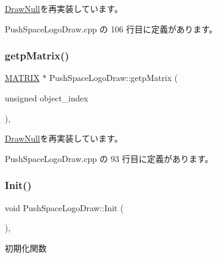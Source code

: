 \mbox{\hyperlink{class_draw_null_aa07d7e89e723b68ec257da0f63d43f70}{Draw\+Null}}を再実装しています。



 Push\+Space\+Logo\+Draw.\+cpp の 106 行目に定義があります。

\mbox{\label{class_push_space_logo_draw_a9e0875967651293ef97713477334bc2e}} 
\subsubsection{\texorpdfstring{getp\+Matrix()}{getpMatrix()}}
{\footnotesize\ttfamily \mbox{\hyperlink{_vector3_d_8h_a032295cd9fb1b711757c90667278e744}{M\+A\+T\+R\+IX}} $\ast$ Push\+Space\+Logo\+Draw\+::getp\+Matrix (\begin{DoxyParamCaption}\item[{unsigned}]{object\+\_\+index }\end{DoxyParamCaption})\hspace{0.3cm}{\ttfamily [override]}, {\ttfamily [virtual]}}



\mbox{\hyperlink{class_draw_null_a001901c340671106a33d44b9d4aef4c4}{Draw\+Null}}を再実装しています。



 Push\+Space\+Logo\+Draw.\+cpp の 93 行目に定義があります。

\mbox{\label{class_push_space_logo_draw_a7ad3fe53d9bda4ea16c958bc102ff54e}} 
\subsubsection{\texorpdfstring{Init()}{Init()}}
{\footnotesize\ttfamily void Push\+Space\+Logo\+Draw\+::\+Init (\begin{DoxyParamCaption}{ }\end{DoxyParamCaption})\hspace{0.3cm}{\ttfamily [override]}, {\ttfamily [virtual]}}



初期化関数 



